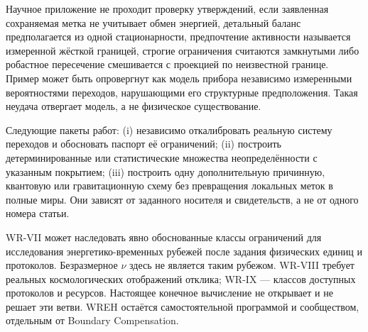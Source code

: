 {Научное приложение не проходит проверку утверждений, если заявленная сохраняемая метка не учитывает обмен энергией, детальный баланс предполагается из одной стационарности, предпочтение активности называется измеренной жёсткой границей, строгие ограничения считаются замкнутыми либо робастное пересечение смешивается с проекцией по неизвестной границе. Пример может быть опровергнут как модель прибора независимо измеренными вероятностями переходов, нарушающими его структурные предположения. Такая неудача отвергает модель, а не физическое существование.}

{Следующие пакеты работ: (i) независимо откалибровать реальную систему переходов и обосновать паспорт её ограничений; (ii) построить детерминированные или статистические множества неопределённости с указанным покрытием; (iii) построить одну дополнительную причинную, квантовую или гравитационную схему без превращения локальных меток в полные миры. Они зависят от заданного носителя и свидетельств, а не от одного номера статьи.}

\begingroup\raggedright
{}
{WR-VII может наследовать явно обоснованные классы ограничений для исследования энергетико-временных рубежей после задания физических единиц и протоколов. Безразмерное $\nu$ здесь не является таким рубежом. WR-VIII требует реальных космологических отображений отклика; WR-IX --- классов доступных протоколов и ресурсов. Настоящее конечное вычисление не открывает и не решает эти ветви. WREH остаётся самостоятельной программой и сообществом, отдельным от Boundary Compensation.}
\par\endgroup

